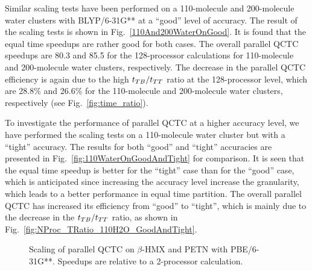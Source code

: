 \commentoutA{\documentclass[prl,aps,twocolumn,twocolumngrid,superbib]{revtex4}}
\begin{document}
Similar scaling tests have been performed on a 110-molecule and
200-molecule water clusters with BLYP/6-31G** at a ``good'' level of
accuracy.  The result of the scaling tests is shown in
Fig.~\ref{110And200WaterOnGood}. It is found that the equal time
speedups are rather good for both cases. The overall parallel QCTC
speedups are
80.3 and 85.5 for the 128-processor calculations for 110-molecule and
200-molecule water clusters, respectively.
The decrease in the parallel QCTC efficiency is again due to the
high $t_{TB}/t_{TT}$ ratio at the 128-processor level, which are 28.8\%
and 26.6\% for the 110-molecule and 200-molecule water clusters,
respectively (see Fig.~\ref{fig:time_ratio}).

To investigate the performance of parallel QCTC at a higher accuracy
level, we have performed the scaling tests on a 110-molecule water
cluster but with a ``tight'' accuracy. The results for both ``good''
and ``tight'' accuracies are presented in
Fig.~\ref{fig:110WaterOnGoodAndTight} for comparison.  It is seen that
the equal time speedup is better for the ``tight'' case than for the
``good'' case, which is anticipated since increasing the accuracy
level increase the granularity, which leads to a better performance in
equal time partition\cite{CGan03}.  The overall parallel QCTC has
increased its efficiency from ``good'' to ``tight'', which is mainly
due to the decrease in the $t_{TB}/t_{TT}$ ratio, as shown in
Fig.~\ref{fig:NProc_TRatio_110H2O_GoodAndTight}.


\begin{figure}[t]
\caption{ 
Scaling of parallel QCTC on $\beta$-HMX and PETN with PBE/6-31G**.
Speedups are relative to a 2-processor calculation.  }
\label{fig:111DHMX212PETN}
\end{figure}
\end{document}

